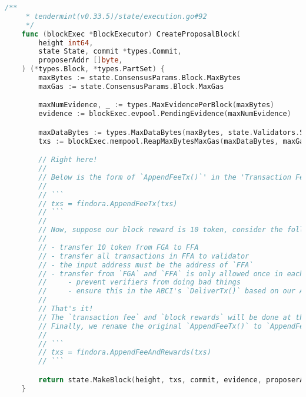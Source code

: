 \begin{lstlisting}[language=go]
    /**
     * tendermint(v0.33.5)/state/execution.go#92
     */
    func (blockExec *BlockExecutor) CreateProposalBlock(
        height int64,
        state State, commit *types.Commit,
        proposerAddr []byte,
    ) (*types.Block, *types.PartSet) {
        maxBytes := state.ConsensusParams.Block.MaxBytes
        maxGas := state.ConsensusParams.Block.MaxGas

        maxNumEvidence, _ := types.MaxEvidencePerBlock(maxBytes)
        evidence := blockExec.evpool.PendingEvidence(maxNumEvidence)

        maxDataBytes := types.MaxDataBytes(maxBytes, state.Validators.Size(), len(evidence))
        txs := blockExec.mempool.ReapMaxBytesMaxGas(maxDataBytes, maxGas)

        // Right here!
        //
        // Below is the form of `AppendFeeTx()`' in the 'Transaction Fee' section:
        //
        // ```
        // txs = findora.AppendFeeTx(txs)
        // ```
        //
        // Now, suppose our block reward is 10 token, consider the following rules:
        //
        // - transfer 10 token from FGA to FFA
        // - transfer all transactions in FFA to validator
        // - the input address must be the address of `FFA`
        // - transfer from `FGA` and `FFA` is only allowed once in each block
        //     - prevent verifiers from doing bad things
        //     - ensure this in the ABCI's `DeliverTx()` based on our APP logic
        //
        // That's it!
        // The `transaction fee` and `block rewards` will be done at the same time.
        // Finally, we rename the original `AppendFeeTx()` to `AppendFeeAndRewards()`:
        //
        // ```
        // txs = findora.AppendFeeAndRewards(txs)
        // ```

        return state.MakeBlock(height, txs, commit, evidence, proposerAddr)
    }
\end{lstlisting}
